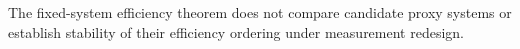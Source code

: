 The fixed-system efficiency theorem does not compare candidate proxy systems or establish stability of their efficiency ordering under measurement redesign.